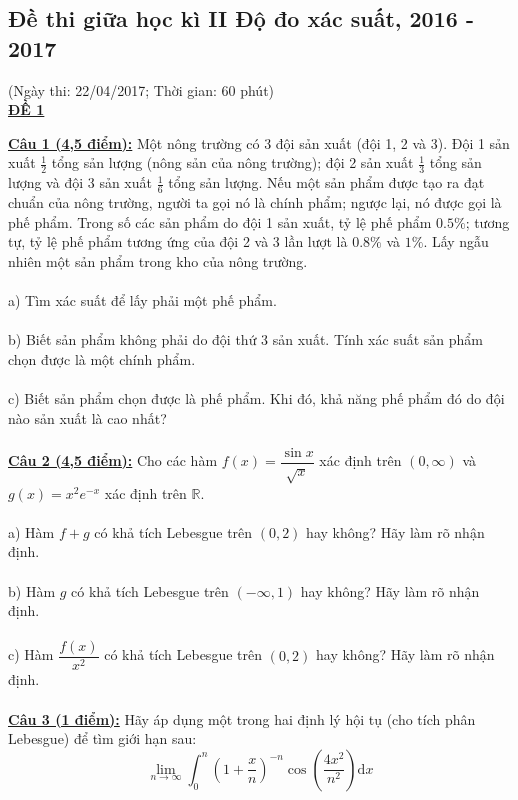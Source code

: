 \documentclass[10pt, a4paper]{article}
\begin{document}
\subsection{Đề thi giữa học kì II Độ đo xác suất, 2016 - 2017}
\begin{center}
	\color{blue}(Ngày thi: 22/04/2017; Thời gian: 60 phút)\\
	\underline{\textbf{ĐỀ 1}}
\end{center}
\color{red}\underline{\textbf{Câu 1 (4,5 điểm):}} \color{black}Một nông trường có 3 đội sản xuất (đội 1, 2 và 3). Đội 1 sản xuất $\frac12$ tổng sản lượng (nông sản của nông trường); đội 2 sản xuất $\frac13$ tổng sản lượng và đội 3 sản xuất $\frac16$ tổng sản lượng. Nếu một sản phẩm được tạo ra đạt chuẩn của nông trường, người ta gọi nó là chính phẩm; ngược lại, nó được gọi là phế phẩm. Trong số các sản phẩm do đội 1 sản xuất, tỷ lệ phế phẩm $0.5\%$; tương tự, tỷ lệ phế phẩm tương ứng của đội 2 và 3 lần lượt là $0.8\%$ và $1\%$. Lấy ngẫu nhiên một sản phẩm trong kho của nông trường.\\\\
\color{red}a) \color{black}Tìm xác suất để lấy phải một phế phẩm.\\\\
\color{red}b) \color{black}Biết sản phẩm không phải do đội thứ 3 sản xuất. Tính xác suất sản phẩm chọn được là một chính phẩm.\\\\
\color{red}c) \color{black}Biết sản phẩm chọn được là phế phẩm. Khi đó, khả năng phế phẩm đó do đội nào sản xuất là cao nhất?\\\\
\color{red}\underline{\textbf{Câu 2 (4,5 điểm):}} \color{black}Cho các hàm $f(x)=\dfrac{\sin x}{\sqrt x}$ xác định trên $(0,\infty)$ và $g(x)=x^2e^{-x}$ xác định trên $\mathbb R$.\\\\
\color{red}a) \color{black}Hàm $f+g$ có khả tích Lebesgue trên $(0,2)$ hay không? Hãy làm rõ nhận định.\\\\
\color{red}b) \color{black}Hàm $g$ có khả tích Lebesgue trên $(-\infty, 1)$ hay không? Hãy làm rõ nhận định.\\\\
\color{red}c) \color{black}Hàm $\dfrac{f(x)}{x^2}$ có khả tích Lebesgue trên $(0,2)$ hay không? Hãy làm rõ nhận định.\\\\
\color{red}\underline{\textbf{Câu 3 (1 điểm):}} \color{black}Hãy áp dụng một trong hai định lý hội tụ (cho tích phân Lebesgue) để tìm giới hạn sau: $$\displaystyle\lim_{n\rightarrow\infty}\displaystyle\int_0^n\left(1+\dfrac xn\right)^{-n}\cos\left(\dfrac{4x^2}{n^2}\right)\text{d}x$$
\end{document}
